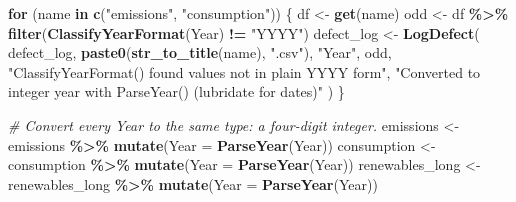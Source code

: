 \documentclass[
]{article}
\newenvironment{Shaded}{\begin{snugshade}}{\end{snugshade}}
\newcommand{\AttributeTok}[1]{\textcolor[rgb]{0.13,0.29,0.53}{#1}}
\newcommand{\CommentTok}[1]{\textcolor[rgb]{0.56,0.35,0.01}{\textit{#1}}}
\newcommand{\ControlFlowTok}[1]{\textcolor[rgb]{0.13,0.29,0.53}{\textbf{#1}}}
\newcommand{\FunctionTok}[1]{\textcolor[rgb]{0.13,0.29,0.53}{\textbf{#1}}}
\newcommand{\NormalTok}[1]{#1}
\newcommand{\OtherTok}[1]{\textcolor[rgb]{0.56,0.35,0.01}{#1}}
\newcommand{\SpecialCharTok}[1]{\textcolor[rgb]{0.81,0.36,0.00}{\textbf{#1}}}
\newcommand{\StringTok}[1]{\textcolor[rgb]{0.31,0.60,0.02}{#1}}
\begin{document}
\begin{Shaded}
\begin{Highlighting}[]
\ControlFlowTok{for}\NormalTok{ (name }\ControlFlowTok{in} \FunctionTok{c}\NormalTok{(}\StringTok{"emissions"}\NormalTok{, }\StringTok{"consumption"}\NormalTok{)) \{}
\NormalTok{  df }\OtherTok{\textless{}{-}} \FunctionTok{get}\NormalTok{(name)}
\NormalTok{  odd }\OtherTok{\textless{}{-}}\NormalTok{ df }\SpecialCharTok{\%\textgreater{}\%} \FunctionTok{filter}\NormalTok{(}\FunctionTok{ClassifyYearFormat}\NormalTok{(Year) }\SpecialCharTok{!=} \StringTok{"YYYY"}\NormalTok{)}
\NormalTok{  defect\_log }\OtherTok{\textless{}{-}} \FunctionTok{LogDefect}\NormalTok{(}
\NormalTok{    defect\_log, }\FunctionTok{paste0}\NormalTok{(}\FunctionTok{str\_to\_title}\NormalTok{(name), }\StringTok{".csv"}\NormalTok{), }\StringTok{"Year"}\NormalTok{, odd,}
    \StringTok{"ClassifyYearFormat() found values not in plain YYYY form"}\NormalTok{,}
    \StringTok{"Converted to integer year with ParseYear() (lubridate for dates)"}
\NormalTok{  )}
\NormalTok{\}}

\CommentTok{\# Convert every Year to the same type: a four{-}digit integer.}
\NormalTok{emissions }\OtherTok{\textless{}{-}}\NormalTok{ emissions }\SpecialCharTok{\%\textgreater{}\%} \FunctionTok{mutate}\NormalTok{(}\AttributeTok{Year =} \FunctionTok{ParseYear}\NormalTok{(Year))}
\NormalTok{consumption }\OtherTok{\textless{}{-}}\NormalTok{ consumption }\SpecialCharTok{\%\textgreater{}\%} \FunctionTok{mutate}\NormalTok{(}\AttributeTok{Year =} \FunctionTok{ParseYear}\NormalTok{(Year))}
\NormalTok{renewables\_long }\OtherTok{\textless{}{-}}\NormalTok{ renewables\_long }\SpecialCharTok{\%\textgreater{}\%} \FunctionTok{mutate}\NormalTok{(}\AttributeTok{Year =} \FunctionTok{ParseYear}\NormalTok{(Year))}


\end{Highlighting}
\end{Shaded}
\end{document}
